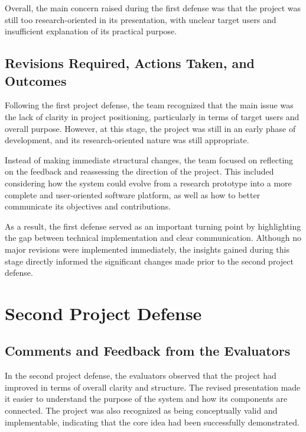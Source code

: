 Overall, the main concern raised during the first defense was that the project was still too research-oriented in its presentation, with unclear target users and insufficient explanation of its practical purpose.

\subsection{Revisions Required, Actions Taken, and Outcomes}
\label{subsec:first-defense-revisions}

Following the first project defense, the team recognized that the main issue was the lack of clarity in project positioning, particularly in terms of target users and overall purpose. However, at this stage, the project was still in an early phase of development, and its research-oriented nature was still appropriate.

Instead of making immediate structural changes, the team focused on reflecting on the feedback and reassessing the direction of the project. This included considering how the system could evolve from a research prototype into a more complete and user-oriented software platform, as well as how to better communicate its objectives and contributions.

As a result, the first defense served as an important turning point by highlighting the gap between technical implementation and clear communication. Although no major revisions were implemented immediately, the insights gained during this stage directly informed the significant changes made prior to the second project defense.

\section{Second Project Defense}
\label{sec:second-defense}

\subsection{Comments and Feedback from the Evaluators}
\label{subsec:second-defense-feedback}

In the second project defense, the evaluators observed that the project had improved in terms of overall clarity and structure. The revised presentation made it easier to understand the purpose of the system and how its components are connected. The project was also recognized as being conceptually valid and implementable, indicating that the core idea had been successfully demonstrated.

